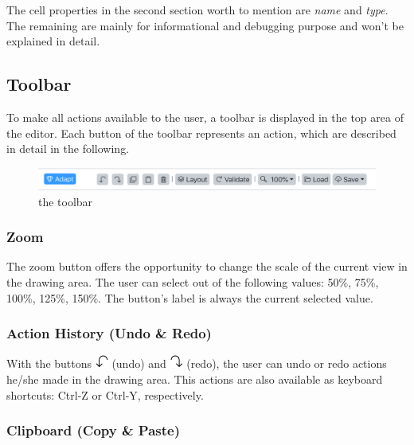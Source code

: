 \documentclass[a4paper,top=25mm,bottom=25mm,12pt,pdftex,halfparskip,twoside,bibtotoc,numbers=noenddot]{scrbook}
\begin{document}
The cell properties in the second section worth to mention are \textit{name} and \textit{type}. The remaining are mainly for informational and debugging purpose and won't be explained in detail.

\subsection{Toolbar}

To make all actions available to the user, a toolbar is displayed in the top area of the editor. Each button of the toolbar represents an action, which are described in detail in the following.

\begin{figure}[H]
\centering
\includegraphics[width=\textwidth]{toolbar}
\caption{the toolbar}
\label{fig:editor-toolbar}
\end{figure}

\subsubsection{Zoom}

The zoom button offers the opportunity to change the scale of the current view in the drawing area. The user can select out of the following values: 50\%, 75\%, 100\%, 125\%, 150\%. The button's label is always the current selected value.

\subsubsection{Action History (Undo \& Redo)}

With the buttons \includegraphics[height=12pt]{editor-toolbar-undo} (undo) and \includegraphics[height=12pt]{editor-toolbar-redo} (redo), the user can undo or redo actions he/she made in the drawing area. This actions are also available as keyboard shortcuts: \textsf{Ctrl-Z} or \textsf{Ctrl-Y}, respectively.

\subsubsection{Clipboard (Copy \& Paste)}
\end{document}
